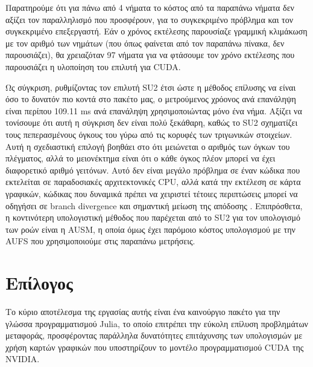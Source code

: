 Παρατηρούμε ότι για πάνω από 4 νήματα το κόστος από τα παραπάνω νήματα δεν αξίζει τον παραλληλισμό που προσφέρουν, για το συγκεκριμένο πρόβλημα και τον συγκεκριμένο επεξεργαστή.
Εάν ο χρόνος εκτέλεσης παρουσίαζε γραμμική κλιμάκωση με τον αριθμό των νημάτων (που όπως φαίνεται από τον παραπάνω πίνακα, δεν παρουσιάζει), θα χρειαζόταν 97 νήματα για να φτάσουμε τον χρόνο εκτέλεσης που παρουσιάζει η υλοποίηση του επιλυτή για CUDA.

Ως σύγκριση, ρυθμίζοντας τον επιλυτή SU2 έτσι ώστε η μέθοδος επίλυσης να είναι όσο το δυνατόν πιο κοντά στο πακέτο μας, ο μετρούμενος χρόονος ανά επανάληψη είναι περίπου 109.11 ms ανά επανάληψη χρησιμοποιώντας μόνο ένα νήμα.
Αξίζει να τονίσουμε ότι αυτή η σύγκριση δεν είναι πολύ ξεκάθαρη, καθώς το SU2 σχηματίζει τους πεπερασμένους όγκους του γύρω από τις κορυφές των τριγωνικών στοιχείων.
Αυτή η σχεδιαστική επιλογή βοηθάει στο ότι μειώνεται ο αριθμός των όγκων του πλέγματος, αλλά το μειονέκτημα είναι ότι ο κάθε όγκος πλέον μπορεί να έχει διαφορετικό αριθμό γειτόνων.
Αυτό δεν είναι μεγάλο πρόβλημα σε έναν κώδικα που εκτελείται σε παραδοσιακές αρχιτεκτονικές CPU, αλλά κατά την εκτέλεση σε κάρτα γραφικών, κώδικας που δυναμικά πρέπει να χειριστεί τέτοιες περιπτώσεις μπορεί να οδηγήσει σε branch divergence και σημαντική μείωση της απόδοσης \cite{Patterson2017}.
Επιπρόσθετα, η κοντινότερη υπολογιστική μέθοδος που παρέχεται από το SU2 για τον υπολογισμό των ροών είναι η AUSM, η οποία όμως έχει παρόμοιο κόστος υπολογισμού με την AUFS που χρησιμοποιούμε στις παραπάνω μετρήσεις.

\section{Επίλογος}

Το κύριο αποτέλεσμα της εργασίας αυτής είναι ένα καινούργιο πακέτο για την γλώσσα προγραμματισμού Julia, το οποίο επιτρέπει την εύκολη επίλυση προβλημάτων μεταφοράς, προσφέροντας παράλληλα δυνατότητες επιτάχυνσης των υπολογισμών με χρήση καρτών γραφικών που υποστηρίζουν το μοντέλο προγραμματισμού CUDA της NVIDIA.

